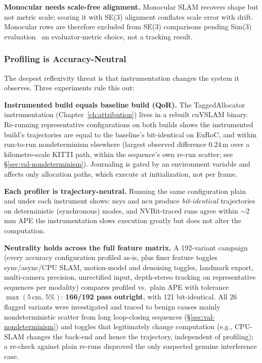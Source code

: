 \textbf{Monocular needs scale-free alignment.} Monocular SLAM recovers shape but not metric scale; scoring it with SE(3) alignment conflates scale error with drift. Monocular rows are therefore excluded from SE(3) comparisons pending Sim(3) evaluation~\cite{umeyama1991} an evaluator-metric choice, not a tracking result.

\subsubsection{Profiling is Accuracy-Neutral}
\label{sec:val-neutrality}

The deepest reflexivity threat is that instrumentation changes the system it observes. Three experiments rule this out:

\textbf{Instrumented build equals baseline build (QoR).} The TaggedAllocator instrumentation (Chapter~\ref{ch:attribution}) lives in a rebuilt cuVSLAM binary. Re-running representative configurations on both builds shows the instrumented build's trajectories are equal to the baseline's bit-identical on EuRoC, and within run-to-run nondeterminism elsewhere (largest observed difference 0.24\,m over a kilometre-scale KITTI path, within the sequence's own re-run scatter; see \S\ref{sec:val-nondeterminism}). Journaling is gated by an environment variable and affects only allocation paths, which execute at initialization, not per frame.

\textbf{Each profiler is trajectory-neutral.} Running the same configuration plain and under each instrument shows: nsys and ncu produce \emph{bit-identical} trajectories on deterministic (synchronous) modes, and NVBit-traced runs agree within $\sim$2\,mm APE the instrumentation slows execution greatly but does not alter the computation.

\textbf{Neutrality holds across the full feature matrix.} A 192-variant campaign (every accuracy configuration profiled as-is, plus finer feature toggles sync/async/CPU SLAM, motion-model and denoising toggles, landmark export, multi-camera precision, unrectified input, depth-stereo tracking on representative sequences per modality) compares profiled vs.\ plain APE with tolerance $\max(5\,\text{cm},\,5\%)$: \textbf{166/192 pass outright}, with 121 bit-identical. All 26 flagged variants were investigated and traced to benign causes mainly nondeterministic scatter from long loop-closing sequences (\S\ref{sec:val-nondeterminism}) and toggles that legitimately change computation (e.g., CPU-SLAM changes the back-end and hence the trajectory, independent of profiling); a re-check against plain re-runs disproved the only suspected genuine interference case.

